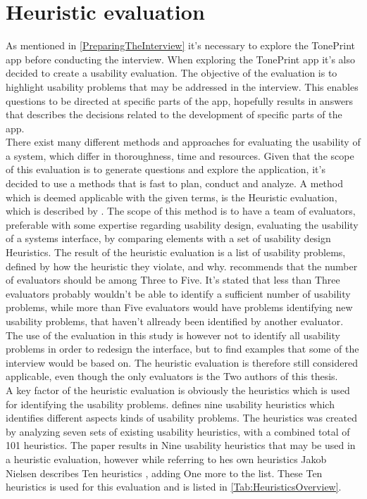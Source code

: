 \section{Heuristic evaluation}
\label{SectionHeuristicEvaluation}
As mentioned in \autoref{PreparingTheInterview} it's necessary to explore the TonePrint app before conducting the interview. When exploring the TonePrint app it's also decided to create a usability evaluation. The objective of the evaluation is to highlight usability problems that may be addressed in the interview. This enables questions to be directed at specific parts of the app, hopefully results in answers that describes the decisions related to the development of specific parts of the app. \\
There exist many different methods and approaches for evaluating the usability of a system, which differ in thoroughness, time and resources. Given that the scope of this evaluation is to generate questions and explore the application, it's decided to use a methods that is fast to plan, conduct and analyze. A method which is deemed applicable with the given terms, is the Heuristic evaluation, which is described by \parencite{WEB:Nielsen1994HowTo}. The scope of this method is to have a team of evaluators, preferable with some expertise regarding usability design, evaluating the usability of a systems interface, by comparing elements with a set of usability design Heuristics. The result of the heuristic evaluation is a list of usability problems, defined by how the heuristic they violate, and why. \textcite{WEB:Nielsen1994HowTo} recommends that the number of evaluators should be among Three to Five. It's stated that less than Three evaluators probably wouldn't be able to identify a sufficient number of usability problems, while more than Five evaluators would have problems identifying new usability problems, that haven't allready been identified by another evaluator. The use of the evaluation in this study is however not to identify all usability problems in order to redesign the interface, but to find examples that some of the interview would be based on. The heuristic evaluation is therefore still considered applicable, even though the only evaluators is the Two authors of this thesis.\\ 
A key factor of the heuristic evaluation is obviously the heuristics which is used for identifying the usability problems. \textcite{WEB:Nielsen1994} defines nine usability heuristics which identifies different aspects kinds of usability problems. The heuristics was created by analyzing seven sets of existing usability heuristics, with a combined total of 101 heuristics. The paper results in Nine usability heuristics that may be used in a heuristic evaluation, however while referring to hes own heuristics \parencite{WEB:Nielsen1994} Jakob Nielsen describes Ten heuristics \parencite{WEB:Nielsen1994Ten,WEB:Nielsen1994HowTo}, adding One more to the list. These Ten heuristics is used for this evaluation and is listed in \autoref{Tab:HeuristicsOverview}.

